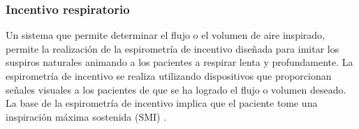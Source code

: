 \documentclass[12pt]{article}
\begin{document}
\subsubsection{Incentivo respiratorio}
Un sistema que permite determinar el flujo o el volumen de aire inspirado, permite la realización de la espirometría de incentivo diseñada para imitar los suspiros naturales animando a los pacientes a respirar lenta y profundamente. 
La espirometría de incentivo se realiza utilizando dispositivos que proporcionan señales visuales a los pacientes de que se ha logrado el flujo o volumen deseado. La base de la espirometría de incentivo implica que el paciente tome una inspiración máxima sostenida (SMI) \cite{21}.






\end{document}
